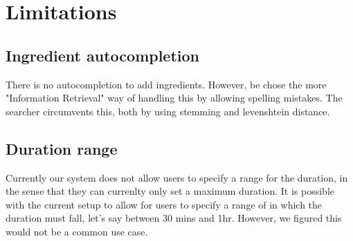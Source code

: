 \documentclass{article}
\begin{document}
\section{Limitations}
\subsection{Ingredient autocompletion}
There is no autocompletion to add ingredients. However, be chose the more
"Information Retrieval" way of handling this by allowing spelling mistakes.
The searcher circumvents this, both by using stemming and levenshtein distance.
\subsection{Duration range}
Currently our system does not allow users to specify a range for the duration,
in the sense that they can currenlty only set a maximum duration.
It is possible with the current setup to allow for users to specify a range of
in which the duration must fall, let's say between 30 mins and 1hr. However,
we figured this would not be a common use case.
\end{document}

